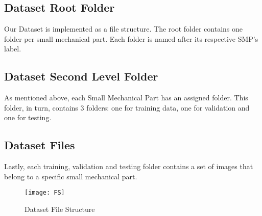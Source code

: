 \subsection{Dataset Root Folder}
Our Dataset is implemented as a file structure. The root folder contains one folder per small mechanical part. Each folder is named after its respective SMP's label.

\subsection{Dataset Second Level Folder}
As mentioned above, each Small Mechanical Part has an assigned folder. This folder, in turn, contains 3 folders: one for training data, one for validation and one for testing.

\subsection{Dataset Files}
Lastly, each training, validation and testing folder contains a set of images that belong to a specific small mechanical part.


\begin{figure}[h]
\centering
  \texttt{[image: FS]}
\caption{Dataset File Structure}
\label{fig:FS}
\end{figure}




